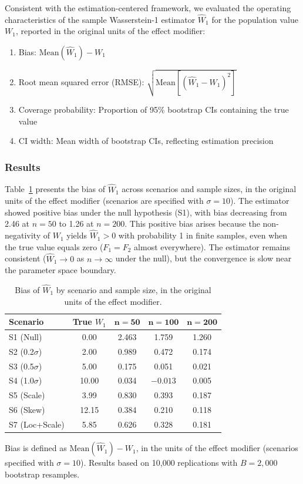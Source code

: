 \documentclass[AMA,Times1COL]{WileyNJDv5}
\begin{document}
Consistent with the estimation-centered framework, we evaluated the operating characteristics of the sample Wasserstein-1 estimator $\widehat{W}_1$ for the population value $W_1$, reported in the original units of the effect modifier:
\begin{enumerate}[1.]
\item Bias: $\text{Mean}(\widehat{W}_1) - W_1$
\item Root mean squared error (RMSE): $\sqrt{\text{Mean}[(\widehat{W}_1 - W_1)^2]}$
\item Coverage probability: Proportion of 95\% bootstrap CIs containing the true value
\item CI width: Mean width of bootstrap CIs, reflecting estimation precision
\end{enumerate}

\subsubsection{Results}\label{sec:sim_results}

Table~\ref{tab:bias} presents the bias of $\widehat{W}_1$ across scenarios and sample sizes, in the original units of the effect modifier (scenarios are specified with $\sigma = 10$). The estimator showed positive bias under the null hypothesis (S1), with bias decreasing from 2.46 at $n=50$ to 1.26 at $n=200$. This positive bias arises because the non-negativity of $W_1$ yields $\widehat{W}_1 > 0$ with probability 1 in finite samples, even when the true value equals zero ($F_1 = F_2$ almost everywhere). The estimator remains consistent ($\widehat{W}_1 \to 0$ as $n \to \infty$ under the null), but the convergence is slow near the parameter space boundary.

\begin{table}[ht]
\centering
\caption{Bias of $\widehat{W}_1$ by scenario and sample size, in the original units of the effect modifier.\label{tab:bias}}
\begin{tabular}{lcccc}
\toprule
\textbf{Scenario} & \textbf{True $W_1$} & $\boldsymbol{n=50}$ & $\boldsymbol{n=100}$ & $\boldsymbol{n=200}$ \\
\midrule
S1 (Null) & 0.00 & 2.463 & 1.759 & 1.260 \\
S2 (0.2$\sigma$) & 2.00 & 0.989 & 0.472 & 0.174 \\
S3 (0.5$\sigma$) & 5.00 & 0.175 & 0.051 & 0.021 \\
S4 (1.0$\sigma$) & 10.00 & 0.034 & $-0.013$ & 0.005 \\
S5 (Scale) & 3.99 & 0.830 & 0.393 & 0.187 \\
S6 (Skew) & 12.15 & 0.384 & 0.210 & 0.118 \\
S7 (Loc+Scale) & 5.85 & 0.626 & 0.328 & 0.181 \\
\bottomrule
\end{tabular}
\begin{tablenotes}
\item Bias is defined as $\text{Mean}(\widehat{W}_1) - W_1$, in the units of the effect modifier (scenarios specified with $\sigma = 10$). Results based on 10{,}000 replications with $B = 2{,}000$ bootstrap resamples.
\end{tablenotes}
\end{table}
\end{document}

